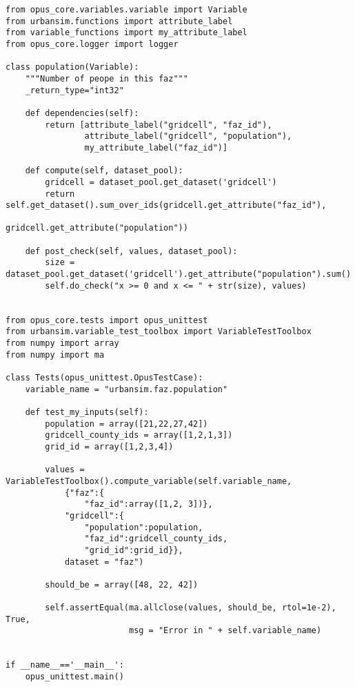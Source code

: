 \variablesindex\attributesindex\numpyindex
\begin{verbatim}
from opus_core.variables.variable import Variable
from urbansim.functions import attribute_label
from variable_functions import my_attribute_label
from opus_core.logger import logger

class population(Variable):
    """Number of peope in this faz"""
    _return_type="int32"

    def dependencies(self):
        return [attribute_label("gridcell", "faz_id"), 
                attribute_label("gridcell", "population"), 
                my_attribute_label("faz_id")]

    def compute(self, dataset_pool):
        gridcell = dataset_pool.get_dataset('gridcell')
        return self.get_dataset().sum_over_ids(gridcell.get_attribute("faz_id"), 
                                   gridcell.get_attribute("population"))

    def post_check(self, values, dataset_pool):
        size = dataset_pool.get_dataset('gridcell').get_attribute("population").sum()
        self.do_check("x >= 0 and x <= " + str(size), values)
    

from opus_core.tests import opus_unittest
from urbansim.variable_test_toolbox import VariableTestToolbox
from numpy import array
from numpy import ma

class Tests(opus_unittest.OpusTestCase):
    variable_name = "urbansim.faz.population"
 
    def test_my_inputs(self):
        population = array([21,22,27,42]) 
        gridcell_county_ids = array([1,2,1,3]) 
        grid_id = array([1,2,3,4])
        
        values = VariableTestToolbox().compute_variable(self.variable_name, 
            {"faz":{
                "faz_id":array([1,2, 3])}, 
            "gridcell":{ 
                "population":population,
                "faz_id":gridcell_county_ids, 
                "grid_id":grid_id}}, 
            dataset = "faz")

        should_be = array([48, 22, 42])
        
        self.assertEqual(ma.allclose(values, should_be, rtol=1e-2), True, 
                         msg = "Error in " + self.variable_name)


if __name__=='__main__':
    opus_unittest.main()
\end{verbatim}

